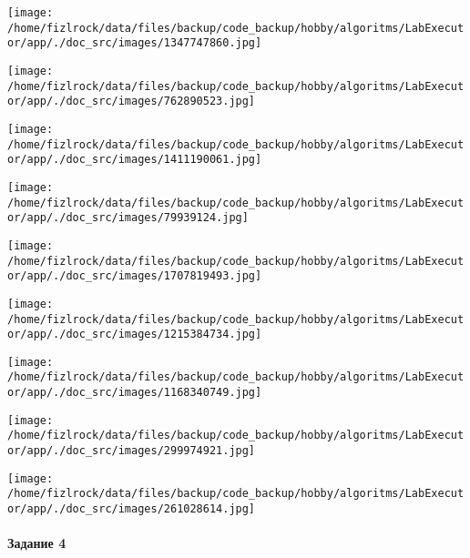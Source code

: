 \documentclass[a4paper, 12pt]{article}
\begin{document}
\texttt{[image: /home/fizlrock/data/files/backup/code\_backup/hobby/algoritms/LabExecutor/app/./doc\_src/images/1347747860.jpg]}

\texttt{[image: /home/fizlrock/data/files/backup/code\_backup/hobby/algoritms/LabExecutor/app/./doc\_src/images/762890523.jpg]}

\texttt{[image: /home/fizlrock/data/files/backup/code\_backup/hobby/algoritms/LabExecutor/app/./doc\_src/images/1411190061.jpg]}

\texttt{[image: /home/fizlrock/data/files/backup/code\_backup/hobby/algoritms/LabExecutor/app/./doc\_src/images/79939124.jpg]}

\texttt{[image: /home/fizlrock/data/files/backup/code\_backup/hobby/algoritms/LabExecutor/app/./doc\_src/images/1707819493.jpg]}

\texttt{[image: /home/fizlrock/data/files/backup/code\_backup/hobby/algoritms/LabExecutor/app/./doc\_src/images/1215384734.jpg]}

\texttt{[image: /home/fizlrock/data/files/backup/code\_backup/hobby/algoritms/LabExecutor/app/./doc\_src/images/1168340749.jpg]}

\texttt{[image: /home/fizlrock/data/files/backup/code\_backup/hobby/algoritms/LabExecutor/app/./doc\_src/images/299974921.jpg]}

\texttt{[image: /home/fizlrock/data/files/backup/code\_backup/hobby/algoritms/LabExecutor/app/./doc\_src/images/261028614.jpg]}
\pagebreak
\paragraph{Задание 4}
\end{document}
